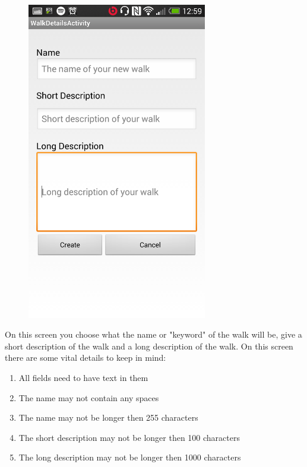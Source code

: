 \documentclass{project}
\begin{document}
\begin{figure}
  \begin{center}
    \includegraphics[width=0.7\textwidth]{details}
  \end{center}
\end{figure}

On this screen you choose what the name or "keyword" of the walk will be, give a short description of the walk  and a long description of the walk. On this screen there are some vital details to keep in mind:


\begin{enumerate}
  \item All fields need to have text in them
  \item The name may not contain any spaces
  \item The name may not be longer then 255 characters
  \item The short description may not be longer then 100 characters
  \item The long description may not be longer then 1000 characters
\end{enumerate}
\end{document}
